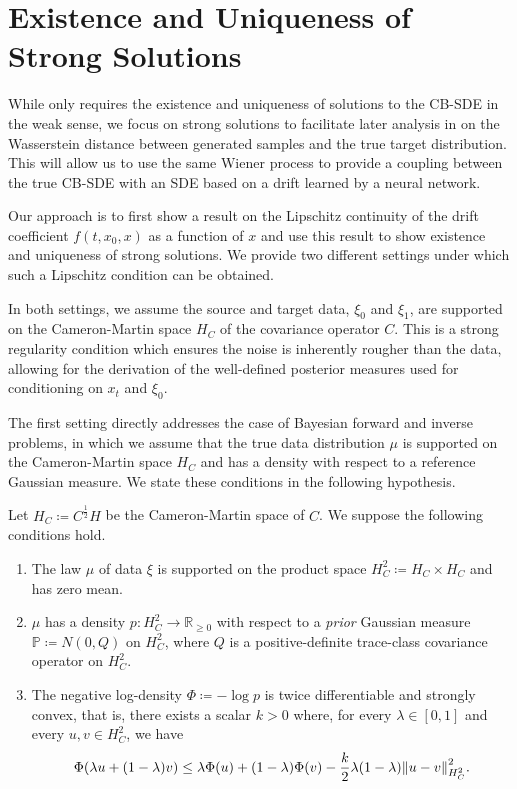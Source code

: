 
\section{Existence and Uniqueness of Strong Solutions}
While  only requires the existence and uniqueness of solutions to the CB-SDE in the weak sense, we focus on strong solutions to facilitate later analysis in  on the Wasserstein distance between generated samples and the true target distribution. This will allow us to use the same Wiener process to provide a coupling between the true CB-SDE with an SDE based on a drift learned by a neural network.

Our approach is to first show a result on the Lipschitz continuity of the drift coefficient \(f(t, x_{0}, x)\) as a function of \(x\) and use this result to show existence and uniqueness of strong solutions. We provide two different settings under which such a Lipschitz condition can be obtained.

In both settings, we assume the source and target data, \(\xi_{0}\) and \(\xi_{1}\), are supported on the Cameron-Martin space \(H_{C}\) of the covariance operator \(C\). This is a strong regularity condition which ensures the noise is inherently rougher than the data, allowing for the derivation of the well-defined posterior measures used for conditioning on \(x_{t}\) and \(\xi_{0}\).

The first setting directly addresses the case of Bayesian forward and inverse problems, in which we assume that the true data distribution \(\mu\) is supported on the Cameron-Martin space \(H_{C}\) and has a density with respect to a reference Gaussian measure. We state these conditions in the following hypothesis.

\begin{hypothesis}\label{hyp:bayes}
  Let \(H_{C} \coloneqq C^{\frac{1}{2}}H\) be the Cameron-Martin space of \(C\). We suppose the following conditions hold.
  \begin{enumerate}[label=\roman*]
    \item \label{hyp1.1} The law \(\mu\) of data \(\xi\) is supported on the product space \(H_{C}^{2} \coloneqq H_{C} \times H_{C} \) and has zero mean.
    \item \label{hyp1.2} \(\mu\) has a density \(p : H^{2}_{C} \to \mathbb{R}_{\geq 0}\) with respect to a \textit{prior} Gaussian measure \(\mathbb{P} \coloneqq N(0, Q)\) on \(H^{2}_{C}\), where \(Q\) is a positive-definite trace-class covariance operator on \(H_{C}^{2}\).
    \item \label{hyp1.3} The negative log-density \(\Phi \coloneqq - \log p\) is twice differentiable and strongly convex, that is, there exists a scalar \(k > 0\) where, for every \(\lambda \in [0, 1]\) and every \(u, v \in H^{2}_{C}\), we have
      \[
        \Phi(\lambda u + (1 - \lambda)v) \leq \lambda \Phi(u) + (1 - \lambda) \Phi(v) - \frac{k}{2}\lambda(1-\lambda) \norm{u - v}^{2}_{H^{2}_{C}}.
      \]
  \end{enumerate}
\end{hypothesis}

